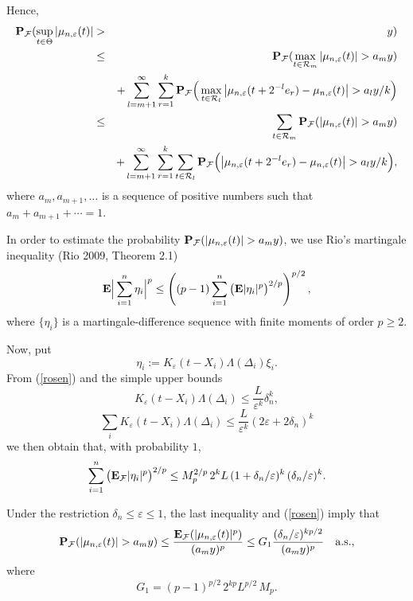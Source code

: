\documentclass[12pt]{article}
\theoremstyle{remark}
\begin{document}
Hence,
\begin{eqnarray}
{\bf P}_{\cal F}(\sup_{t\in \Theta}|\mu_{n,\varepsilon}(t)|&>&y)
\notag \\
&\le&
{\bf P}_{\cal F}(\max_{t\in {\cal R}_m}|\mu_{n,\varepsilon}(t)|
>a_m y)
\notag \\
 &&+
\sum_{l=m+1}^\infty
\sum_{r=1}^k
{\bf P}_{\cal F}\Big(
\max_{t\in {\cal R}_l}
\big|\mu_{n,\varepsilon}(t+2^{-l}e_r)-\mu_{n,\varepsilon}(t)\big|
>a_l y/k\Big)
\notag \\
\label{req1}
&\le&
\sum_{t\in {\cal R}_m}
{\bf P}_{\cal F}(|\mu_{n,\varepsilon}(t)|
>a_m y)
\\
&&+
\sum_{l=m+1}^\infty
\sum_{r=1}^k
\sum_{t\in {\cal R}_l}
{\bf P}_{\cal F}\Big(
\big|\mu_{n,\varepsilon}(t+2^{-l}e_r)-\mu_{n,\varepsilon}(t)\big|
>a_l y/k\Big)
,
\notag
\end{eqnarray}
where $a_m,a_{m+1},\dots$ is a sequence of positive numbers such that
$a_m+a_{m+1}+\cdots=1$.

In order to estimate the probability
${\bf P}_{\cal F}(|\mu_{n,\varepsilon}(t)| >a_m y)$,
we use Rio's  martingale inequality
(Rio 2009, Theorem 2.1)
\begin{eqnarray}\label{rosen}
{\bf E}\Big| \sum^n_{i=1}\eta_i \Big|^p\le \left(
(p-1)
\sum^n_{i=1}\big({\bf E}|\eta_i|^p\big)^{2/p}\right)^{p/2},
\end{eqnarray}
where $\{\eta_i\}$ is a martingale-difference sequence with
finite moments of order $p\ge 2$.

Now, put
$$\eta_i:=K_{\varepsilon}(t-X_{i})\Lambda(\Delta_i)\xi_{i}.$$
From
(\ref{rosen}) and the simple
upper bounds
$$K_{\varepsilon}(t-X_{i})\Lambda(\Delta_i)\le
\frac{L}{\varepsilon^k}\delta^k_n,$$
$$\sum_i K_{\varepsilon}(t-X_{i})\Lambda(\Delta_i)\le
\frac{L}{\varepsilon^k}(2\varepsilon+2\delta_n)^k
$$
we then obtain that, with probability $1$,
$$\sum^n_{i=1}\big({\bf E}_{\cal F}|\eta_i|^p\big )^{2/p}\le
M_p^{2/p}\, 2^k L\,  (1+\delta_n/\varepsilon)^{k}
\,(\delta_n/\varepsilon)^{k}.
$$

Under the restriction $\delta_n\le\varepsilon\le 1$, the last inequality and (\ref{rosen}) imply that
\begin{eqnarray}\label{final1}
{\bf P}_{\cal F}(|\mu_{n,\varepsilon}(t)| >a_m y)
\le \frac{{\bf E}_{\cal F} (|\mu_{n,\varepsilon}(t)|^p)}{(a_m y)^p}
\le G_1
\frac{(\delta_n/\varepsilon)^{kp/2}}{(a_m y)^p} \quad\mbox{a.s.},
\end{eqnarray}
where
$$G_1 = (p-1)^{p/2}\, 2^{kp} L^{p/2}\,  M_p  .$$
\end{document}
